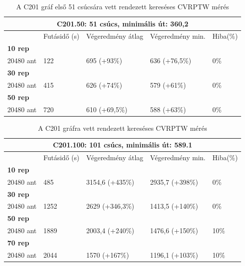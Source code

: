 \begin{table}[ht!]
	\centering
	\begin{tabular}{|p{1.75cm}||p{2cm}|p{3.25cm}|p{3.25cm}|p{1.5cm}|}
		\hline
		\multicolumn{5}{|c|}{C201.50: 51 csúcs, minimális út: 360,2} \\
		\hline
		& Futásidő (s) & Végeredmény átlag & Végeredmény min. & Hiba(\%) \\
		\hline
		\textbf{10 rep} &  &  &  & \\
		20480 ant & 122 & 695 (+93\%) & 636 (+76,5\%) &  0\% \\
		\hline
		\textbf{30 rep} &  &  &  & \\
		20480 ant & 415 & 626 (+74\%) & 579 (+61\%) &  0\% \\
		\hline
		\textbf{50 rep} &  &  &  &  \\
		20480 ant & 720 & 610 (+69,5\%) & 588 (+63\%) &  0\% \\
		\hline
	\end{tabular}
	\caption{A C201 gráf első 51 csúcsára vett rendezett kereséses CVRPTW mérés}
	\label{table:VRTPW2_50_2}
\end{table}

\begin{table}[ht!]
	\centering
	\begin{tabular}{|p{1.75cm}||p{2cm}|p{3.25cm}|p{3.25cm}|p{1.5cm}|}
		\hline
		\multicolumn{5}{|c|}{C201.100: 101 csúcs, minimális út: 589.1} \\
		\hline
		& Futásidő (s) & Végeredmény átlag & Végeredmény min. & Hiba(\%) \\
		\hline
		\textbf{10 rep} &  &  &  &  \\
		20480 ant & 485 & 3154,6 (+435\%) & 2935,7 (+398\%) & 0\% \\
		\hline
		\textbf{30 rep} &  &  &  &  \\
		20480 ant & 1252 & 2629 (+346,3\%) & 1413,5 (+140\%) & 0\% \\
		\hline
		\textbf{50 rep} &  &  &  &  \\
		20480 ant & 1889 & 2003,4 (+240\%) & 1476,6 (+150\%) & 10\% \\
		\hline
		\textbf{70 rep} &  &  &  &  \\
		20480 ant & 2044 & 1570 (+167\%) & 1196,1 (+103\%) &  10\% \\
		\hline
	\end{tabular}
	\caption{A C201 gráfra vett rendezett kereséses CVRPTW mérés}
	\label{table:VRTPW2_100_2}
\end{table}

